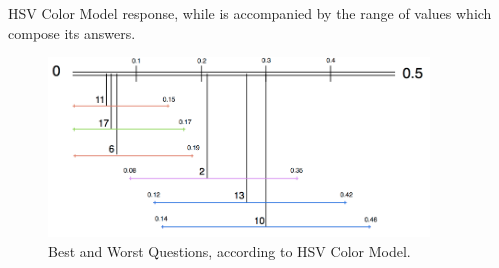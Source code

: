 HSV Color Model response, while is accompanied by the range of values which compose its answers. \par
%
\begin{figure}[!htbp]
  \centering
  \includegraphics[width=0.9\textwidth]{images/hsv_questions_analysis.png}
  \caption[Best and Worst Questions, according to HSV Color Model.]{Best and Worst Questions, according to HSV Color Model.}
  \label{fig:hsv_analysis}
\end{figure}
%
%
